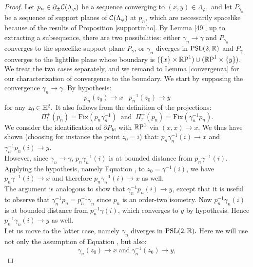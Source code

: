 \begin{proof}
    Let $p_n\in\partial_\pm\CF$ be a sequence converging to $(x,y)\in\Lambda_\varphi,$ and let $P_{\gamma_n}$ be a sequence of support planes of $\CF$ at $p_n$, which are necessarily spacelike because of the results of Proposition \ref{supportinho}. By Lemma \ref{49}, up to extracting a subsequence, there are two possibilities: either $\gamma_n\to\gamma$ and $P_{\gamma_n}$ converges to the spacelike support plane $P_\gamma$, or $\gamma_n$ diverges in $\PSL$ and $P_{\gamma_n}$ converges to the lightlike plane whose boundary is $(\{x\}\times\S)\cup(\S\times\{y\})$. We treat the two cases separately, and we remand to Lemma \ref{convergenza} for our characterization of convergence to the boundary.
    We start by supposing the convergence $\gamma_n\to\gamma.$ By hypothesis: 
    \begin{equation}\label{18}
        p_n(z_0)\to x \;\;\; p_n^{-1}(z_0)\to y
    \end{equation}
    for any $z_0\in\H^2.$ It also follows from the definition of the projections: 
    \begin{equation}\label{19}
        \Pi_l^\pm(p_n)=\text{Fix}(p_n\gamma_n^{-1}) \;\; \text{and}\;\; \Pi_r^\pm(p_n)=\text{Fix}(\gamma_n^{-1}p_n).
    \end{equation}
  We consider the identification of $\partial P_\text{Id}$ with $\S$ via $(x,x)\to x. $ We thus have shown (choosing for instance the point $z_0=i$) that: $p_n\gamma_n^{-1}(i)\to x$ and $\gamma_n^{-1}p_n(i)\to y.$ \\
  However, since $\gamma_n\to\gamma$, $p_n\gamma_n^{-1}(i)$ is at bounded distance from $p_n\gamma^{-1}(i)$. Applying the hypothesis, namely Equation , to $z_0=\gamma^{-1}(i)$, we have $p_n\gamma^{-1}(i)\to x$ and therefore $p_n\gamma_n^{-1}(i)\to x$ as well. \\
  The argument is analogous to show that $\gamma_n^{-1}p_n(i)\to y$, except that it is useful to observe that $\gamma_n^{-1}p_n=p_n^{-1}\gamma_n$ since $p_n$ is an order-two isometry. Now $p_n^{-1}\gamma_n(i)$ is at bounded distance from $p_n^{-1}\gamma(i)$, which converges to $y$ by hypothesis. Hence $p_n^{-1}\gamma_n(i)\to y$ as well. \\
  Let us move to the latter case, namely $\gamma_n$ diverges in $\PSL.$ Here we will use not only the assumption of Equation , but also: 
  \begin{equation}\label{20}
    \gamma_n(z_0)\to x\;\text{and}\;\gamma_n^{-1}(z_0)\to y,
  \end{equation} 

\end{proof}

